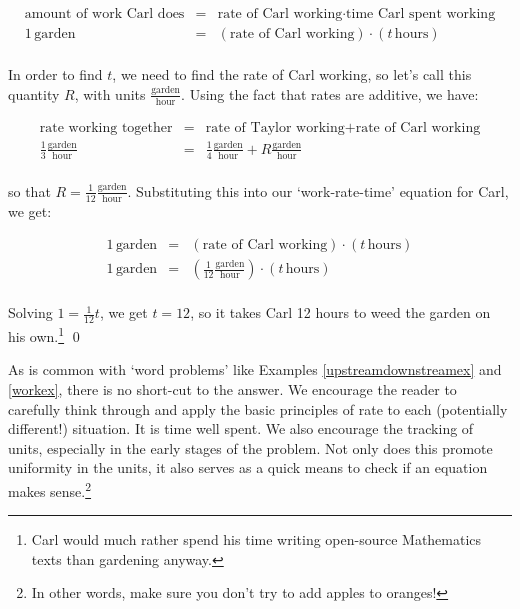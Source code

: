 \begin{ex}
\[ \begin{array}{rcl}

\text{amount of work Carl does} & = & \text{rate of Carl working} \cdot \text{time Carl spent working} \\

1 \, \text{garden} & = & (\text{rate of Carl working}) \cdot (t \, \text{hours}) \\ \end{array} \]

In order to find $t$, we need to find the rate of Carl working, so let's call this quantity $R$, with units $\frac{\text{garden}}{\text{hour}}$.  Using the fact that rates are additive, we have:

\[ \begin{array}{rcl}

\text{rate working together} & = & \text{rate of Taylor working} + \text{rate of Carl working} \\ [5pt]

\frac{1}{3} \frac{\text{garden}}{\text{hour}} & = & \frac{1}{4} \frac{\text{garden}}{\text{hour}} + R \frac{\text{garden}}{\text{hour}} \\ \end{array} \]

so that $R = \frac{1}{12} \frac{\text{garden}}{\text{hour}}$.  Substituting this into our `work-rate-time' equation for Carl, we get:

\[ \begin{array}{rcl}

1 \, \text{garden} & = & (\text{rate of Carl working}) \cdot (t \, \text{hours}) \\ [5pt] 

1 \, \text{garden} & = & \left(\frac{1}{12} \frac{\text{garden}}{\text{hour}} \right) \cdot (t \, \text{hours}) \\ \end{array} \]

Solving $1 = \frac{1}{12} t$, we get $t = 12$, so it takes Carl 12 hours to weed the garden on his own.\footnote{Carl would much rather spend his time writing open-source Mathematics texts than gardening anyway.} \qed

\end{ex}

As is common with `word problems' like Examples \ref{upstreamdownstreamex} and \ref{workex}, there is no short-cut to the answer.  We encourage the reader to carefully think through and apply the basic principles of rate to each (potentially different!) situation.  It is time well spent.  We also encourage the tracking of units, especially in the early stages of the problem.  Not only does this promote uniformity in the units, it also serves as a quick means to check if an equation makes sense.\footnote{In other words, make sure you don't try to add apples to oranges!}

